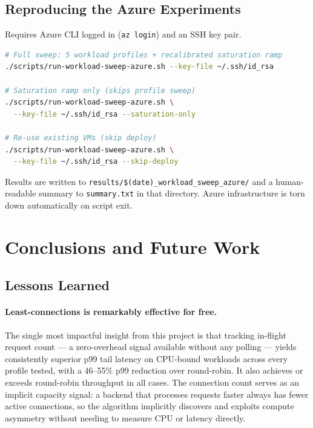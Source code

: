 \documentclass[12pt]{article}
\begin{document}
\subsection{Reproducing the Azure Experiments}

Requires Azure CLI logged in (\texttt{az login}) and an SSH key pair.

\begin{lstlisting}[language=bash]
# Full sweep: 5 workload profiles + recalibrated saturation ramp
./scripts/run-workload-sweep-azure.sh --key-file ~/.ssh/id_rsa

# Saturation ramp only (skips profile sweep)
./scripts/run-workload-sweep-azure.sh \
  --key-file ~/.ssh/id_rsa --saturation-only

# Re-use existing VMs (skip deploy)
./scripts/run-workload-sweep-azure.sh \
  --key-file ~/.ssh/id_rsa --skip-deploy
\end{lstlisting}

Results are written to \texttt{results/\$(date)\_workload\_sweep\_azure/} and
a human-readable summary to \texttt{summary.txt} in that directory. Azure
infrastructure is torn down automatically on script exit.

\section{Conclusions and Future Work}

\subsection{Lessons Learned}

\paragraph{Least-connections is remarkably effective for free.}
The single most impactful insight from this project is that tracking in-flight
request count --- a zero-overhead signal available without any polling ---
yields consistently superior p99 tail latency on CPU-bound workloads across
every profile tested, with a 46--55\% p99 reduction over round-robin. It also
achieves or exceeds round-robin throughput in all cases. The connection count
serves as an implicit capacity signal: a backend that processes requests faster
always has fewer active connections, so the algorithm implicitly discovers and
exploits compute asymmetry without needing to measure CPU or latency directly.
\end{document}
